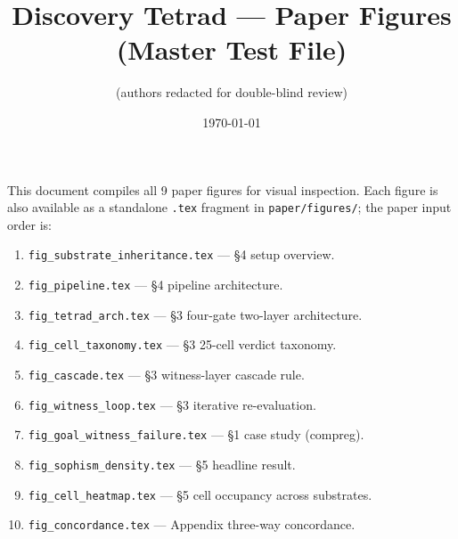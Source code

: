 \documentclass[11pt]{article}
\title{Discovery Tetrad — Paper Figures (Master Test File)}
\author{(authors redacted for double-blind review)}
\date{\today}
\begin{document}
\maketitle

\noindent This document compiles all 9 paper figures for visual inspection.
Each figure is also available as a standalone \texttt{.tex} fragment in
\texttt{paper/figures/}; the paper input order is:

\begin{enumerate}\itemsep0pt
  \item \texttt{fig\_substrate\_inheritance.tex} — \S 4 setup overview.
  \item \texttt{fig\_pipeline.tex} — \S 4 pipeline architecture.
  \item \texttt{fig\_tetrad\_arch.tex} — \S 3 four-gate two-layer architecture.
  \item \texttt{fig\_cell\_taxonomy.tex} — \S 3 25-cell verdict taxonomy.
  \item \texttt{fig\_cascade.tex} — \S 3 witness-layer cascade rule.
  \item \texttt{fig\_witness\_loop.tex} — \S 3 iterative re-evaluation.
  \item \texttt{fig\_goal\_witness\_failure.tex} — \S 1 case study (compreg).
  \item \texttt{fig\_sophism\_density.tex} — \S 5 headline result.
  \item \texttt{fig\_cell\_heatmap.tex} — \S 5 cell occupancy across substrates.
  \item \texttt{fig\_concordance.tex} — Appendix three-way concordance.
\end{enumerate}

\clearpage










\end{document}
